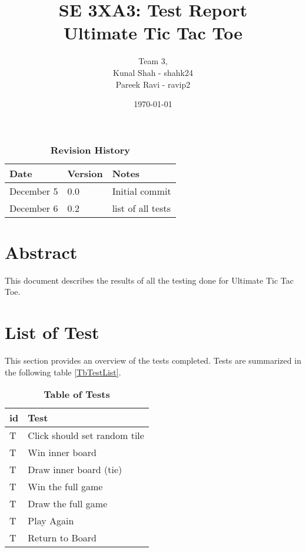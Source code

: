 \documentclass[12pt, titlepage]{article}
\title{SE 3XA3: Test Report\\Ultimate Tic Tac Toe}
\author{Team 3,
		\\ Kunal Shah - shahk24
		\\ Pareek Ravi - ravip2
}
\date{\today}
\newcounter{tnum}
\newcommand{\tthetnum}{T\thetnum}
\begin{document}

\maketitle

\tableofcontents
\listoftables
\listoffigures

\newpage
\begin{table}[hp]
\caption{\bf Revision History}
\begin{tabularx}{\textwidth}{p{3cm}p{2cm}X}
\toprule {\bf Date} & {\bf Version} & {\bf Notes}\\
\midrule
December 5 & 0.0 & Initial commit\\
December 6 & 0.2 & list of all tests\\

\bottomrule
\end{tabularx}
\end{table}

\newpage


\section*{Abstract}
This document describes the results of all the testing done for Ultimate Tic Tac Toe.

\section*{List of Test}

This section provides an overview of the tests completed. Tests are summarized
in the following table \ref{TbTestList}. 

\begin{table}[hp]
\caption{\textbf{Table of Tests}} \label{TbTestList}
\begin{tabularx}{\textwidth}{p{1cm}X}
\toprule
\textbf{id} & \textbf{Test} \\
\midrule

\tthetnum{}{tnum} \label{test1} & Click should set random tile \\
\tthetnum{}{tnum} \label{test2} & Win inner board \\
\tthetnum{}{tnum} \label{test3} & Draw inner board (tie) \\
\tthetnum{}{tnum} \label{test4} & Win the full game\\
\tthetnum{}{tnum} \label{test5} & Draw the full game\\
\tthetnum{}{tnum} \label{test6} & Play Again\\
\tthetnum{}{tnum} \label{test7} & Return to Board\\

\bottomrule
\end{tabularx}
\end{table}
\end{document}
